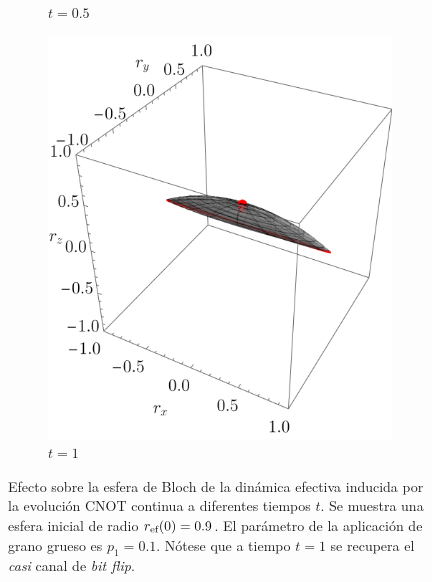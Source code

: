 \begin{figure}[ht!]
\begin{subfigure}{0.32\textwidth}
    \caption{$t=0.5$}
  \end{subfigure}
  \begin{subfigure}{0.32\textwidth}
    \centering
    \includegraphics[width=0.9\linewidth]{chapter4/figures_toy/CNOT_p=0.1_t=1._r=0.9.png}
    \caption{$t=1$}
  \end{subfigure}
  \caption{Efecto sobre la esfera de Bloch de la dinámica efectiva inducida por la evolución CNOT continua a diferentes tiempos $t$. Se muestra una esfera inicial de radio $r_{\text{ef}}(0)=0.9$. El parámetro de la aplicación de grano grueso es $p_{1}=0.1$. Nótese que a tiempo $t=1$ se recupera el \textit{casi} canal de \textit{bit flip}. \label{fig:AlmostBitFlipSequence}}
  \end{figure}

